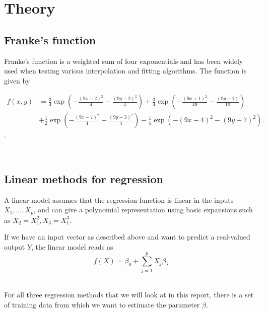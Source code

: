 \section{Theory}

\subsection{Franke's function}

Franke's function is a weighted sum of four exponentials and has been 
widely used when testing various interpolation and fitting algorithms.
The function is given by 

\begin{align*}
	f(x,y) &= 
	\frac{3}{4}\exp{\left(-\frac{(9x-2)^2}{4} 
	- \frac{(9y-2)^2}{4}\right)}
	+\frac{3}{4}\exp{\left(-\frac{(9x+1)^2}{49}
	- \frac{(9y+1)}{10}\right)} \\
	&+\frac{1}{2}\exp{\left(-\frac{(9x-7)^2}{4} 
	- \frac{(9y-3)^2}{4}\right)} 
	-\frac{1}{5}\exp{\left(-(9x-4)^2 - (9y-7)^2\right) }.
\end{align*}. 

~\cite{Project1}

\subsection{Linear methods for regression}

A linear model assumes that the regression function is linear in the 
inputs \(X_1, \dots, X_p\), and can give a polynomial representation
using basic expansions such as \(X_2 = X_1^2, X_3 = X_1^3\). 

If we have an input vector as described above and want to predict 
a real-valued output \(Y\), the linear model reads as
\begin{equation}
	f(X) = \beta_0 + \sum\limits_{j=1}^p X_j\beta_j
\end{equation}
~\cite{IntroStatistics}

For all three regression methods that we will look at in this report, 
there is a set of training data from which we want to estimate the parameter 
\(\beta\). 




